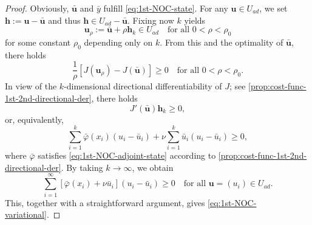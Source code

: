 \documentclass[10pt,a4paper]{amsart}
\begin{document}
\begin{proof}
	Obviously, $\bm{\bar u}$ and $\bar y$ fulfill \eqref{eq:1st-NOC-state}.
	For any $\bm{u} \in U_{ad}$, we set $\bm{h} := \bm{u} - \bm{\bar u}$ and thus $\bm{h} \in U_{ad} - \bm{\bar u}$.
	Fixing now $k$ yields
	\[
		\bm{u}_\rho := \bm{\bar u} + \rho \bm{h}_k \in U_{ad} \quad \text{for all } 0 < \rho < \rho_0 
	\]
	for some constant $\rho_0$ depending only on $k$. 	From this and the optimality of $\bm{\bar u}$, there holds
	\[
		\frac{1}{\rho} \left[ J(\bm{u}_\rho) - J(\bm{\bar u})\right] \geq 0 \quad \text{for all } 0 < \rho < \rho_0.
	\]
	In view of the $k$-dimensional directional differentiability of $J$; see \cref{prop:cost-func-1st-2nd-directional-der}, there holds
	\[
		J'(\bm{\bar u}) \bm{h}_k \geq 0,
	\]
	or, equivalently, 
	\[
		\sum_{i=1}^k \bar\varphi(x_i) (u_i - \bar u_i) + \nu \sum_{i=1}^k \bar u_i (u_i - \bar u_i) \geq 0,
	\]
	where ${\bar{\varphi}}$ satisfies \eqref{eq:1st-NOC-adjoint-state} according to \cref{prop:cost-func-1st-2nd-directional-der}.
	By taking $k \to \infty$, we obtain
	\begin{equation*}
		\sum_{i=1}^\infty [\bar\varphi(x_i) + \nu \bar u_i] (u_i - \bar u_i) \geq 0 \quad \text{for all } \bm{u} = (u_i) \in U_{ad}.
	\end{equation*}
	This, together with a straightforward argument, gives \eqref{eq:1st-NOC-variational}.
\end{proof}
\end{document}
